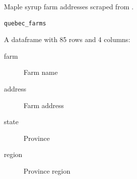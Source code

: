 %
\begin{Description}
Maple syrup farm addresses scraped from
.
\end{Description}
%
\begin{Usage}
\begin{verbatim}
quebec_farms
\end{verbatim}
\end{Usage}
%
\begin{Format}
%
\begin{SubSection}{}

A dataframe with 85 rows and 4 columns:
\begin{description}

\item[farm] Farm name
\item[address] Farm address
\item[state] Province
\item[region] Province region

\end{description}

\end{SubSection}

\end{Format}
